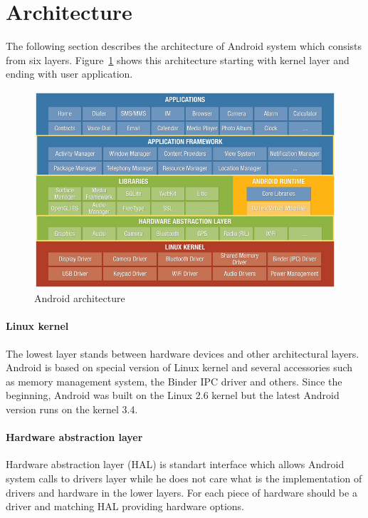\section{Architecture}
The following section describes the architecture of Android system which consists from six layers. Figure~\ref{androidArchitecture} shows this architecture starting with kernel layer and ending with user application.
\\
\begin{figure}[h!]
    \centering
    \includegraphics[scale=0.55]{fig/android_architecture.jpg}
    \caption{Android architecture \cite{AndroidArch}}
    \label{androidArchitecture}
\end{figure}

\paragraph{Linux kernel}
The lowest layer stands between hardware devices and other architectural layers. Android is based on special version of Linux kernel and several accessories such as memory management system, the Binder IPC driver and others. Since the beginning, Android was built on the Linux 2.6 kernel but the latest Android version runs on the kernel 3.4.

\paragraph{Hardware abstraction layer}
Hardware abstraction layer (HAL) is standart interface which allows Android system calls to drivers layer while he does not care what is the implementation of drivers and hardware in the lower layers. For each piece of hardware should be a driver and matching HAL providing hardware options.

